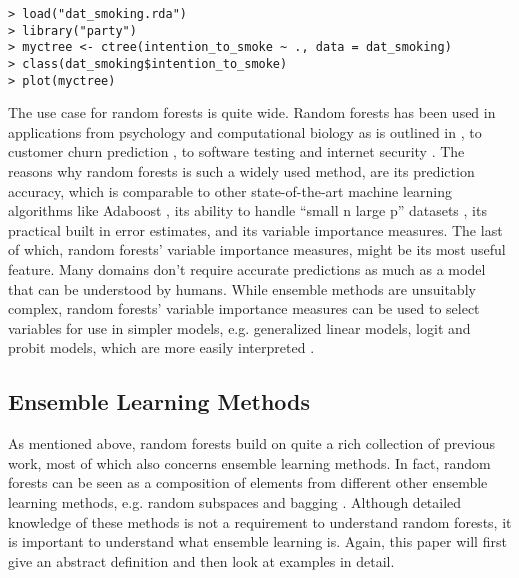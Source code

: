 \documentclass[a4paper,man,12pt,apacite]{apa6} %
\begin{document}
\begin{verbatim}
> load("dat_smoking.rda")
> library("party")
> myctree <- ctree(intention_to_smoke ~ ., data = dat_smoking)
> class(dat_smoking$intention_to_smoke)
> plot(myctree)
\end{verbatim}

The use case for random forests is quite wide.
Random forests has been used in applications from psychology and
computational biology as is outlined in \cite{strobl2009introduction},
to customer churn prediction \cite{xie2009customer},
to software testing \cite{guo2004robust} and internet security
\cite{zhang2005network}.
The reasons why random forests is such a widely used method,
are its prediction accuracy, which is comparable to other state-of-the-art
machine learning algorithms like Adaboost \cite{breiman2001random},
its ability to handle “small n large p” datasets \cite{strobl2009introduction},
its practical built in error estimates, and its variable importance measures.
The last of which, random forests' variable importance measures,
might be its most useful feature.
Many domains don't require accurate predictions as much as a model that can
be understood by humans.
While ensemble methods are unsuitably complex,
random forests' variable importance measures can be used to select variables
for use in simpler models, e.g.
generalized linear models, logit and probit models,
which are more easily interpreted \cite{strobl2009introduction}.

\subsection{Ensemble Learning Methods}
As mentioned above, random forests build on quite a rich collection of
previous work, most of which also concerns ensemble learning methods.
In fact, random forests can be seen as a composition of elements from
different other ensemble learning methods, e.g.
random subspaces \cite{ho1998random} and bagging \cite{breiman1996bagging}.
Although detailed knowledge of these methods is not a requirement to
understand random forests, it is important to understand what
ensemble learning is.
Again, this paper will first give an abstract definition and then look at
examples in detail.
\end{document}

